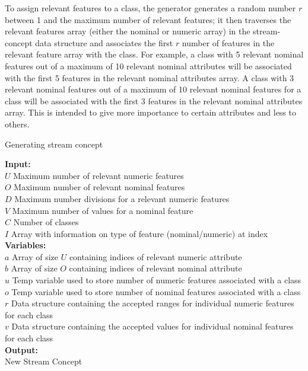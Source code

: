 To assign relevant features to a class, the generator generates a random number $r$ between 1 and the maximum number of relevant features; it then traverses the relevant features array (either the nominal or numeric array) in the stream-concept data structure and associates the first $r$ number of features in the relevant feature array with the class. For example, a class with 5 relevant nominal features out of a maximum of 10 relevant nominal attributes will be associated with the first 5 features in the relevant nominal attributes array. A class with 3 relevant nominal features out of a maximum of 10 relevant nominal features for a class will be associated with the first 3 features in the relevant nominal attributes array. This is intended to give more importance to certain attributes and less to others.

\begin{algorithm}[h]
    \caption{Generating stream concept}
    \label{generateStreamConcept}
    \textbf{Input:} \\ 
    $U$ Maximum number of relevant numeric features \\
    $O$ Maximum number of relevant nominal features \\
    $D$ Maximum number divisions for a relevant numeric features \\
    $V$ Maximum number of values for a nominal feature\\
    $C$ Number of classes \\
    $I$ Array with information on type of feature (nominal/numeric) at index \\
    \textbf{Variables:}\\ 
    $a$ Array of size $U$ containing indices of relevant numeric attribute \\
    $b$ Array of size $O$ containing indices of relevant nominal attribute \\
    $u$ Temp variable used to store number of numeric features associated with a class\\
    $o$ Temp variable used to store number of nominal features associated with a class\\
    $r$ Data structure containing the accepted ranges for individual numeric features for each class\\
    $v$ Data structure containing the accepted values for individual nominal features for each class\\
    \textbf{Output:}\\ New Stream Concept \\
    \begin{algorithmic}[1] %
		

\end{algorithmic}
\end{algorithm}
